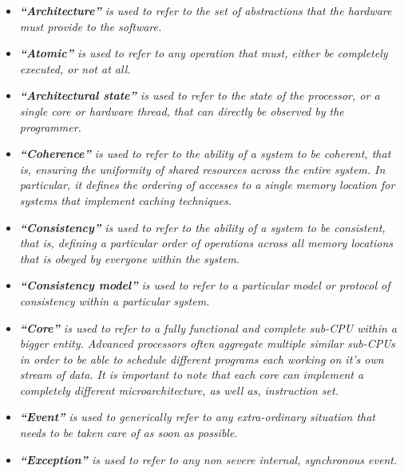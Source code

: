 \documentclass{article}
\begin{document}
            \begin{itemize}

                \item \textit{\textbf{``Architecture''} is used to refer to the set of abstractions that the hardware must provide to the software.}

                \item \textit{\textbf{``Atomic''} is used to refer to any operation that must, either be completely executed, or not at all.}

                \item \textit{\textbf{``Architectural state''} is used to refer to the state of the processor, or a single core or hardware thread, that can directly be observed by the programmer.}

                \item \textit{\textbf{``Coherence''} is used to refer to the ability of a system to be coherent, that is, ensuring the uniformity of shared resources across the entire system. In particular, it defines the ordering of accesses to a single memory location for systems that implement caching techniques.}

                \item \textit{\textbf{``Consistency''} is used to refer to the ability of a system to be consistent, that is, defining a particular order of operations across all memory locations that is obeyed by everyone within the system.}

                \item \textit{\textbf{``Consistency model''} is used to refer to a particular model or protocol of consistency within a particular system.}

                \item \textit{\textbf{``Core''} is used to refer to a fully functional and complete sub-CPU within a bigger entity. Advanced processors often aggregate multiple similar sub-CPUs in order to be able to schedule different programs each working on it's own stream of data. It is important to note that each core can implement a completely different microarchitecture, as well as, instruction set.}

                \item \textit{\textbf{``Event''} is used to generically refer to any extra-ordinary situation that needs to be taken care of as soon as possible.}

                \item \textit{\textbf{``Exception''} is used to refer to any non severe internal, synchronous event.}


\end{itemize}
\end{document}
